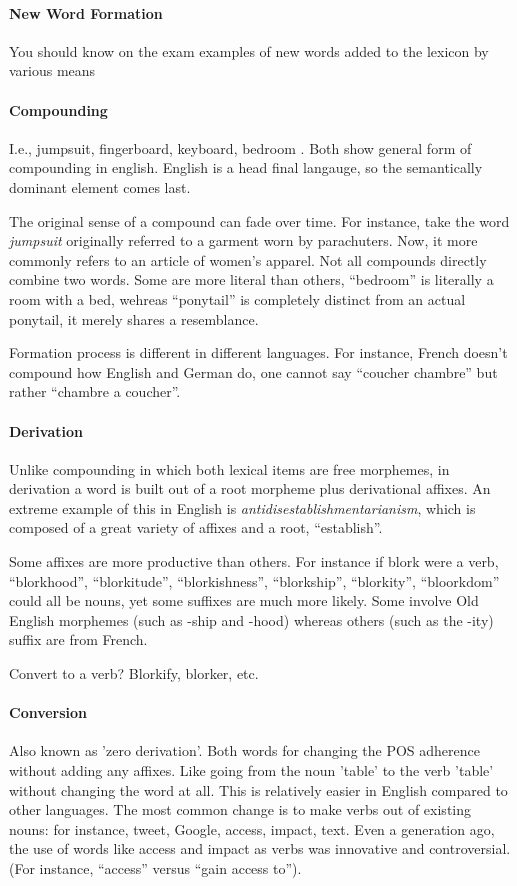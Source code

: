 \documentclass{exam}
\begin{document}
\paragraph{New Word Formation} You should know on the exam examples of new words added to the lexicon by various means

\paragraph{Compounding}
I.e., jumpsuit, fingerboard, keyboard, bedroom . Both show general form of compounding in english. English is a head final langauge, so the semantically dominant element comes last. 

The original sense of a compound can fade over time. 
For instance, take the word \textit{jumpsuit} originally referred to a garment worn by parachuters. 
Now, it more commonly refers to an article of women's apparel. 
Not all compounds directly combine two words. 
Some are more literal than others, ``bedroom'' is literally a room with a bed, wehreas 
``ponytail'' is completely distinct from an actual ponytail, it merely shares a resemblance. 

Formation process is different in different languages. 
For instance, French doesn't compound how English and German do, one cannot say ``coucher chambre'' but rather ``chambre a coucher''. 

\paragraph{Derivation} Unlike compounding in which both lexical items are free morphemes, in derivation a word is built out of a root morpheme plus derivational affixes. 
An extreme example of this in English is \textit{antidisestablishmentarianism}, which is composed of a great variety of affixes and a root, ``establish''. 

Some affixes are more productive than others. For instance if blork were a verb, ``blorkhood'', ``blorkitude'', ``blorkishness'', ``blorkship'', ``blorkity'', ``bloorkdom'' could all be nouns, yet some suffixes are much more likely.  
Some involve Old English morphemes (such as -ship and -hood) whereas others (such as the -ity) suffix are from French. 

Convert to a verb? Blorkify, blorker, etc. 

\paragraph{Conversion} Also known as 'zero derivation'. Both words for changing the POS adherence without adding any affixes. 
Like going from the noun 'table' to the verb 'table' without changing the word at all. 
This is relatively easier in English compared to other languages. 
The most common change is to make verbs out of existing nouns: for instance, tweet, Google, access, impact, text. 
Even a generation ago, the use of words like access and impact as verbs was innovative and controversial. 
(For instance, ``access'' versus ``gain access to''). 
\end{document}
